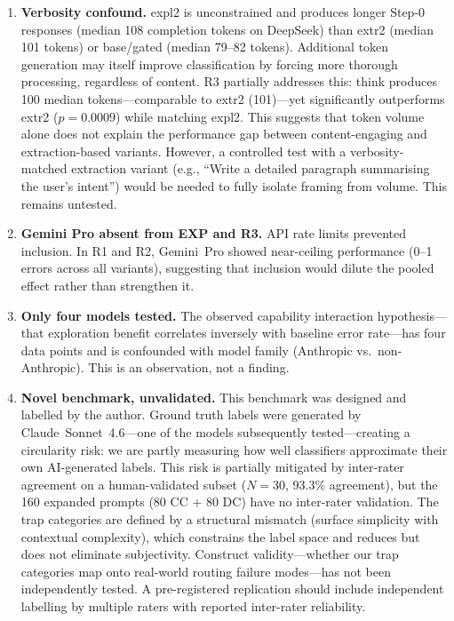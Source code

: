 \documentclass[11pt,a4paper]{article}
\begin{document}
\begin{enumerate}[itemsep=2pt,topsep=4pt]
  \item \textbf{Verbosity confound.}  \textsf{expl2} is unconstrained
    and produces longer Step-0 responses (median 108 completion tokens on
    DeepSeek) than \textsf{extr2} (median 101 tokens) or
    \textsf{base}/\textsf{gated} (median 79--82 tokens).  Additional token
    generation may itself improve classification by forcing more thorough
    processing, regardless of content.  R3 partially addresses this:
    \textsf{think} produces 100 median tokens---comparable to \textsf{extr2}
    (101)---yet significantly outperforms \textsf{extr2} ($p = 0.0009$)
    while matching \textsf{expl2}.  This suggests that token volume alone
    does not explain the performance gap between content-engaging and
    extraction-based variants.  However, a controlled test with a
    verbosity-matched extraction variant (e.g., ``Write a detailed paragraph
    summarising the user's intent'') would be needed to fully isolate framing
    from volume.  This remains untested.

  \item \textbf{Gemini Pro absent from EXP and R3.}  API rate limits
    prevented inclusion.  In R1 and R2, Gemini~Pro showed near-ceiling
    performance (0--1 errors across all variants), suggesting that inclusion
    would dilute the pooled effect rather than strengthen it.

  \item \textbf{Only four models tested.}  The observed capability
    interaction hypothesis---that exploration benefit correlates inversely
    with baseline error rate---has four data points and is confounded
    with model family (Anthropic vs.\ non-Anthropic).  This is an
    observation, not a finding.

  \item \textbf{Novel benchmark, unvalidated.}  This benchmark was
    designed and labelled by the author.  Ground truth labels were generated
    by Claude~Sonnet~4.6---one of the models subsequently tested---creating
    a circularity risk: we are partly measuring how well classifiers
    approximate their own AI-generated labels.  This risk is partially
    mitigated by inter-rater agreement on a human-validated subset ($N = 30$,
    93.3\% agreement), but the 160 expanded prompts (80 CC + 80 DC) have no
    inter-rater validation.  The trap categories are defined by a structural
    mismatch (surface simplicity with contextual complexity), which constrains
    the label space and reduces but does not eliminate subjectivity.  Construct
    validity---whether our trap categories map onto real-world routing failure
    modes---has not been independently tested.  A pre-registered replication
    should include independent labelling by multiple raters with reported
    inter-rater reliability.


\end{enumerate}
\end{document}
